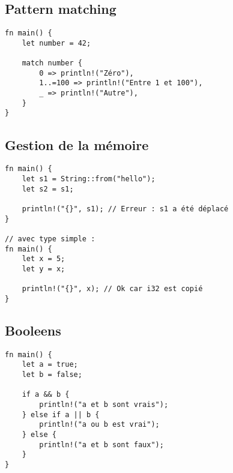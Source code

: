 \documentclass{article}
\begin{document}
\subsection{Pattern matching}
\begin{lstlisting}[]
fn main() {
    let number = 42;

    match number {
        0 => println!("Zéro"),
        1..=100 => println!("Entre 1 et 100"),
        _ => println!("Autre"),
    }
}
\end{lstlisting}

\subsection{Gestion de la mémoire}
\begin{lstlisting}[]
fn main() {
    let s1 = String::from("hello");
    let s2 = s1;

    println!("{}", s1); // Erreur : s1 a été déplacé
}

// avec type simple :
fn main() {
    let x = 5;
    let y = x;

    println!("{}", x); // Ok car i32 est copié
}
\end{lstlisting}

\subsection{Booleens}
\begin{lstlisting}[]
fn main() {
    let a = true;
    let b = false;

    if a && b {
        println!("a et b sont vrais");
    } else if a || b {
        println!("a ou b est vrai");
    } else {
        println!("a et b sont faux");
    }
}
\end{lstlisting}
\end{document}
